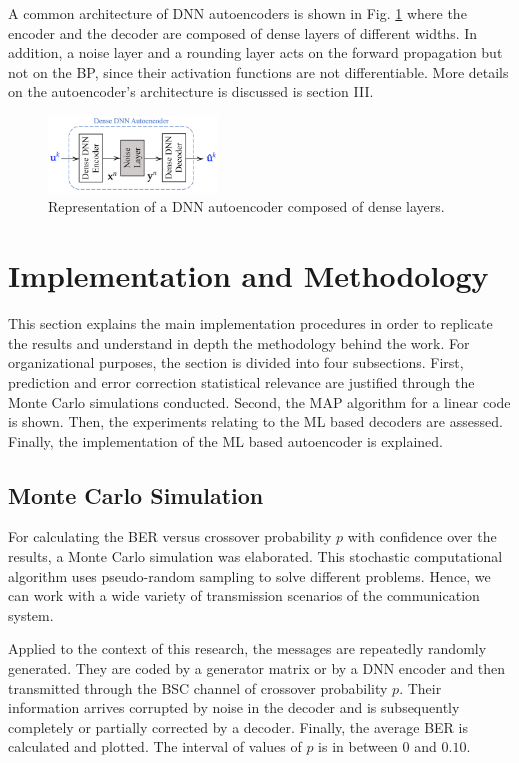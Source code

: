 \documentclass[conference]{IEEEtran}
\begin{document}
A common architecture of DNN autoencoders is shown in Fig. \ref{fig:DDNNAutoencoder} where the encoder and the decoder are composed of dense layers of different widths. In addition, a noise layer and a rounding layer acts on the forward propagation but not on the BP, since their activation functions are not differentiable. More details on the autoencoder's architecture is discussed is section III.  


\begin{figure}[!ht]
  \centering
    \includegraphics[width=0.4\textwidth]{images/DNN_autoencoder}
    \caption{Representation of a DNN autoencoder composed of dense layers.}\label{fig:DDNNAutoencoder}
\end{figure}



\section{Implementation and Methodology}
This section explains the main implementation procedures in order to replicate the results and understand in depth the methodology behind the work. For organizational purposes, the section is divided into four subsections. First, prediction and error correction statistical relevance are justified through the Monte Carlo simulations conducted. Second, the MAP algorithm for a linear code is shown. Then, the experiments relating to the ML based decoders are assessed. Finally, the implementation of the ML based autoencoder is explained. 

\subsection{Monte Carlo Simulation}

For calculating the BER versus crossover probability $p$ with confidence over the results, a Monte Carlo simulation was elaborated. This stochastic computational algorithm uses pseudo-random sampling to solve different problems. Hence, we can work with a wide variety of transmission scenarios of the communication system.

Applied to the context of this research, the messages are repeatedly randomly generated. They are coded by a generator matrix or by a DNN encoder and then transmitted through the BSC channel of crossover probability $p$. Their information arrives corrupted by noise in the decoder and is subsequently completely or partially corrected by a decoder. Finally, the average BER is calculated and plotted. The interval of values of $p$ is in between $0$ and $0.10$.
\end{document}
